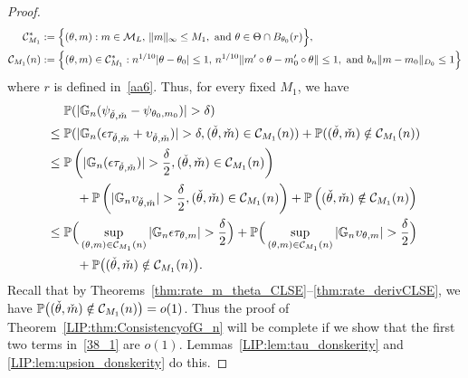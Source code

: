 {\begin{proof}
\begin{align}
%
\mathcal{C}^*_{M_1}&:= \Big\{ (\theta,m):  m\in\M_L,\,\|m\|_\infty \le M_1, \text{ and } \theta \in \Theta\cap B_{\theta_0}(r)\Big\},\label{LIP:eq:c_n}\\
%
%
\mathcal{C}_{M_1}(n)&:= \Big\{ (\theta,m) \in \mathcal{C}^*_{M_1}: n^{1/10} |\theta-\theta_0| \le 1,\, n^{1/10}  \|m'\circ\theta- m'_0\circ\theta\|\le 1, \text{ and } b_n \|m - m_0\|_{D_0} \le 1\Big\}\nonumber\end{align}
where $r$ is defined in~\ref{aa6}.
Thus, for every fixed $M_1$, we have
\begin{align}
&\p( |\g_n ( \psi_{\check{\theta},\check{m}} - \psi_{\theta_0,m_0})|> \delta)\\
 \leq{}& \p(|\g_n ( \epsilon \tau_{\check{\theta},\check{m}} + \upsilon_{\check{\theta},\check{m}})|> \delta, (\check{\theta},\check{m}) \in \mathcal{C}_{M_1}(n) )+\p((\check{\theta},\check{m}) \notin \mathcal{C}_{M_1}(n) ) \\
\leq{}& \p\left(|\g_n ( \epsilon \tau_{\check{\theta},\check{m}} )|> \frac{\delta}{2}, (\check{\theta},\check{m}) \in \mathcal{C}_{M_1}(n) \right)\\
& \quad + \p\left(|\g_n \upsilon_{\check{\theta},\check{m}} |> \frac{\delta}{2}, (\check{\theta},\check{m}) \in \mathcal{C}_{M_1}(n) \right)+\p\left((\check{\theta},\check{m}) \notin \mathcal{C}_{M_1}(n) \right) \\
\leq{}& \p\Big(\sup_{(\theta, m) \in \mathcal{C}_{M_1}(n) } |\g_n \epsilon \tau_{\theta,m}|> \frac{\delta}{2}\Big)+ \p\Big(\sup_{(\theta, m) \in \mathcal{C}_{M_1}(n) } |\g_n \upsilon_{\theta,m} |> \frac{\delta}{2}\Big)\\
& \quad +\p\big((\check{\theta},\check{m}) \notin \mathcal{C}_{M_1}(n) \big). \label{38_1}
\end{align}
Recall that by Theorems~\ref{thm:rate_m_theta_CLSE}--\ref{thm:rate_derivCLSE}, we have $\mathbb{P}\big((\check{\theta},\check{m}) \notin \mathcal{C}_{M_1}(n) \big) =o(1)$. Thus the proof of Theorem~\ref{LIP:thm:ConsistencyofG_n} will be complete if we show that the first two terms in~\eqref{38_1} are $o(1).$ Lemmas~\ref{LIP:lem:tau_donskerity} and \ref{LIP:lem:upsion_donskerity} do this.



\end{proof}}
